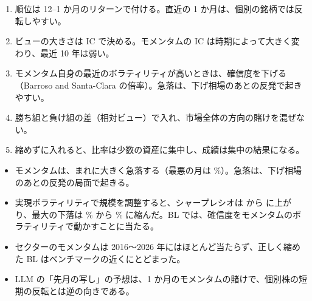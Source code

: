 \begin{tipbox}[コツ：モメンタムのビュー]
\begin{enumerate}
\item 順位は 12--1 か月のリターンで付ける。直近の 1 か月は、個別の銘柄では反転しやすい。
\item ビューの大きさは IC で決める。モメンタムの IC は時期によって大きく変わり、最近 10 年は弱い。
\item モメンタム自身の最近のボラティリティが高いときは、確信度を下げる（Barroso and Santa-Clara の倍率）。急落は、下げ相場のあとの反発で起きやすい。
\item 勝ち組と負け組の差（相対ビュー）で入れ、市場全体の方向の賭けを混ぜない。
\item 縮めずに入れると、比率は少数の資産に集中し、成績は集中の結果になる。
\end{enumerate}
\end{tipbox}

\begin{keybox}[この章のまとめ]
\begin{itemize}
\item モメンタムは、まれに大きく急落する（最悪の月は \%）。急落は、下げ相場のあとの反発の局面で起きる。
\item 実現ボラティリティで規模を調整すると、シャープレシオは  から  に上がり、最大の下落は \% から \% に縮んだ。BL では、確信度をモメンタムのボラティリティで動かすことに当たる。
\item セクターのモメンタムは 2016〜2026 年にはほとんど当たらず、正しく縮めた BL はベンチマークの近くにとどまった。
\item LLM の「先月の写し」の予想は、1 か月のモメンタムの賭けで、個別株の短期の反転とは逆の向きである。
\end{itemize}
\end{keybox}
